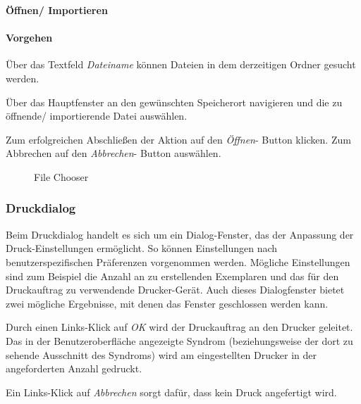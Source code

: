 \documentclass[enabledeprecatedfontcommands,fontsize=11pt,paper=a4,twoside]{scrartcl}
\newcounter{one}
\newcounter{two}[one]
\newcommand*{\action}{\paragraph{Vorgehen}}
\let\tempone\itemize
\let\temptwo\enditemize
\renewenvironment{itemize}{\tempone\addtolength{\itemsep}{-10.0pt}}{\temptwo}
\let\origenumerate\enumerate
\let\origendenumerate\endenumerate
\renewenvironment{enumerate}{\origenumerate \addtolength{\itemsep}{-10.0pt}}{\origendenumerate}
\begin{document}
\textbf{Öffnen/ Importieren}
\action
\begin{enumerate}
	\item Über das Textfeld \textit{Dateiname} können Dateien in dem derzeitigen Ordner gesucht werden.
	\item Über das Hauptfenster an den gewünschten Speicherort navigieren und die zu öffnende/ importierende Datei auswählen.
	\item Zum erfolgreichen Abschließen der Aktion auf den \textit{Öffnen}- Button klicken. Zum Abbrechen auf den \textit{Abbrechen}- Button auswählen.
\end{enumerate}

 \begin{figure}[ht!]
 	\centering
 	\caption{File Chooser}	
 \end{figure}

\newpage
\subsubsection{Druckdialog}
Beim Druckdialog handelt es sich um ein Dialog-Fenster, das der Anpassung der Druck-Einstellungen ermöglicht. So können Einstellungen nach benutzerspezifischen Präferenzen vorgenommen werden. Mögliche Einstellungen sind zum Beispiel die Anzahl an zu erstellenden Exemplaren und das für den Druckauftrag zu verwendende Drucker-Gerät.
Auch dieses Dialogfenster bietet zwei mögliche Ergebnisse, mit denen das Fenster geschlossen werden kann.
\begin{itemize}
	\item Durch einen Links-Klick auf \textit{OK} wird der Druckauftrag an den Drucker geleitet. Das in der Benutzeroberfläche angezeigte Syndrom (beziehungsweise der dort zu sehende Ausschnitt des Syndroms) wird am eingestellten Drucker in der angeforderten Anzahl gedruckt. 
	\item Ein Links-Klick auf \textit{Abbrechen} sorgt dafür, dass kein Druck angefertigt wird.
\end{itemize}
\end{document}
